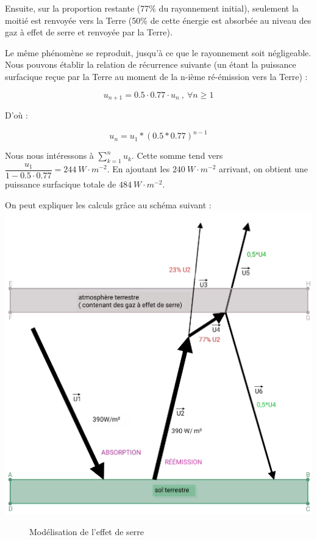 \documentclass[a4paper,11pt]{article}
\begin{document}
Ensuite, sur la proportion restante (77\% du rayonnement initial), seulement la moitié est renvoyée vers la Terre (50\% de cette énergie est absorbée au niveau des gaz à effet de serre et renvoyée par la Terre).
 
Le même phénomène se reproduit, jusqu'à ce que le rayonnement soit négligeable. Nous pouvons établir la relation de récurrence suivante (un étant la puissance surfacique reçue par la Terre au moment de la n-ième ré-émission vers la Terre) : 

\[ u_{n+1} = 0.5 \cdot 0.77 \cdot u_n ~ , ~ \forall n \geq 1 \]

D'où :

\[ u_n = u_1 * (0.5*0.77)^{n-1} \]

Nous nous intéressons à $ \displaystyle\sum_{k=1}^{n} u_k$. Cette somme tend vers $\dfrac{u_1}{1-0.5 \cdot 0.77} = 244 ~ W \cdot m^{-2}$. En ajoutant les $240 ~W \cdot m^{-2}$ arrivant, on obtient une puissance surfacique totale de $484 ~W \cdot m^{-2}$. 

\newpage

On peut expliquer les calculs grâce au schéma suivant : \\

\begin{adjustbox}{center}
\includegraphics[scale=1]{Effet_de_serre}
\end{adjustbox}
\begin{figure}[h]
  \centering
  \caption{Modélisation de l'effet de serre}
\end{figure}

 
\end{document}
